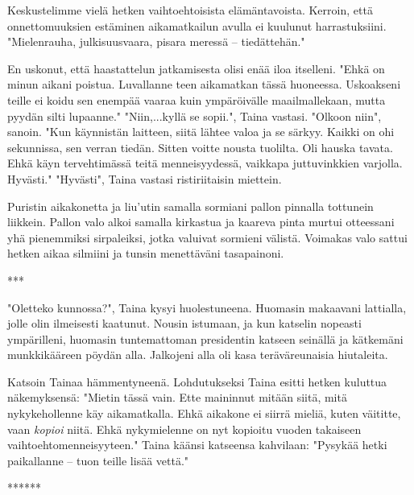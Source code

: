 ﻿\documentclass[a4paper, 12pt, finnish]{article}
\begin{document}
Keskustelimme vielä hetken vaihtoehtoisista elämäntavoista.
Kerroin, että onnettomuuksien estäminen aikamatkailun
avulla ei kuulunut harrastuksiini. "Mielenrauha, julkisuusvaara,
pisara meressä -- tiedättehän."

En uskonut, että haastattelun jatkamisesta olisi enää iloa itselleni.
"Ehkä on minun aikani poistua. Luvallanne teen aikamatkan tässä
huoneessa. Uskoakseni teille ei koidu sen enempää vaaraa kuin
ympäröivälle maailmallekaan, mutta pyydän silti lupaanne."
"Niin,...kyllä se sopii.", Taina vastasi.
"Olkoon niin", sanoin. "Kun käynnistän laitteen, siitä lähtee
valoa ja se särkyy. Kaikki on ohi sekunnissa, sen verran tiedän.
Sitten voitte nousta tuolilta. Oli hauska tavata.
Ehkä käyn tervehtimässä teitä menneisyydessä,
vaikkapa juttuvinkkien varjolla. Hyvästi."
"Hyvästi", Taina vastasi ristiriitaisin miettein.

Puristin aikakonetta ja liu'utin samalla sormiani pallon pinnalla
tottunein liikkein. Pallon valo alkoi samalla kirkastua ja kaareva
pinta murtui otteessani yhä pienemmiksi sirpaleiksi,
jotka valuivat sormieni välistä. Voimakas valo sattui hetken aikaa
silmiini ja tunsin menettäväni tasapainoni.

***

"Oletteko kunnossa?", Taina kysyi huolestuneena. Huomasin makaavani
lattialla, jolle olin ilmeisesti kaatunut. Nousin istumaan, ja
kun katselin nopeasti ympärilleni, huomasin tuntemattoman
presidentin katseen seinällä ja kätkemäni munkkikääreen pöydän alla.
Jalkojeni alla oli kasa teräväreunaisia hiutaleita.

Katsoin Tainaa hämmentyneenä. Lohdutukseksi Taina esitti hetken
kuluttua näkemyksensä: "Mietin tässä vain.
Ette maininnut mitään siitä, mitä nykykehollenne käy aikamatkalla.
Ehkä aikakone ei siirrä mieliä, kuten väititte,
vaan \emph{kopioi} niitä. Ehkä nykymielenne on nyt kopioitu
vuoden takaiseen vaihtoehtomenneisyyteen."
Taina käänsi katseensa kahvilaan:
"Pysykää hetki paikallanne -- tuon teille lisää vettä."

******
\end{document}
